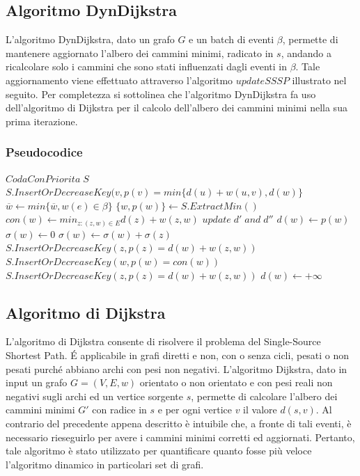\documentclass[a4paper]{article}
\begin{document}
\subsection{Algoritmo DynDijkstra}
L'algoritmo DynDijkstra, dato un grafo $G$ e un batch di eventi $\beta$, permette di mantenere aggiornato l'albero dei cammini minimi, radicato in $s$, andando a ricalcolare solo i cammini che sono stati influenzati dagli eventi in $\beta$. Tale aggiornamento viene effettuato attraverso l'algoritmo $updateSSSP$ illustrato nel seguito. Per completezza si sottolinea che l'algoritmo DynDijkstra fa uso dell'algoritmo di Dijkstra per il calcolo dell'albero dei cammini minimi nella sua prima iterazione.
\subsubsection{Pseudocodice} 
\begin{algorithm}[H]
\caption{$updateSSSP(grafo\, G, vettore \, d, vettore \, \sigma, batch \, \beta) \rightarrow \{ updated \, d(v), updated \, \sigma (v) \; \forall v \in V\}$}
\label{euclid}
\begin{algorithmic}[1]
\State $CodaConPriorita\; S$
\State $S.InsertOrDecreaseKey(v, p(v)= min\{d(u)+w(u,v), d(w)\}$
\EndFor
\State $\overline{w} \gets min\{\overline{w}, w(e) \in \beta \}$
\State $\{w, p(w)\} \gets S.ExtractMin()$
\State $con(w) \gets min_{z:(z,w) \in E} d(z) + w(z,w)$
\State $update \; d' \; and \; d''$
\State $d(w)\gets p(w)$
\State $\sigma (w)\gets 0$
\State  $\sigma(w)\gets \sigma(w)+\sigma (z) $
\EndIf
{}
\State $S.InsertOrDecreaseKey(z, p(z)= d(w)+w(z,w))$
\EndIf 
\EndFor
\Else
{}
\State $S.InsertOrDecreaseKey(w, p(w)= con(w))$
\State $S.InsertOrDecreaseKey(z, p(z)= d(w)+w(z,w))$
\EndIf
\EndFor
\State $d(w)\gets +\infty$
\EndIf
\EndIf
\EndIf
\EndWhile
\end{algorithmic}
\end{algorithm}
\newpage
\subsection{Algoritmo di Dijkstra}
L'algoritmo di Dijkstra consente di risolvere il problema del Single-Source Shortest Path. É applicabile in grafi diretti e non, con o senza cicli, pesati o non pesati purché abbiano archi con pesi non negativi.
L'algoritmo Dijkstra, dato in input un grafo $G=(V,E,w)$ orientato o non orientato e con pesi reali non negativi sugli archi ed un vertice sorgente $s$, permette di calcolare l'albero dei cammini minimi $G'$ con radice in $s$ e per ogni vertice $v$ il valore $d(s,v)$. Al contrario del precedente appena descritto è intuibile che, a fronte di tali eventi, è necessario rieseguirlo per avere i cammini minimi corretti ed aggiornati. 
Pertanto, tale algoritmo è stato utilizzato per quantificare quanto fosse più veloce l'algoritmo dinamico in particolari set di grafi.
\end{document}
